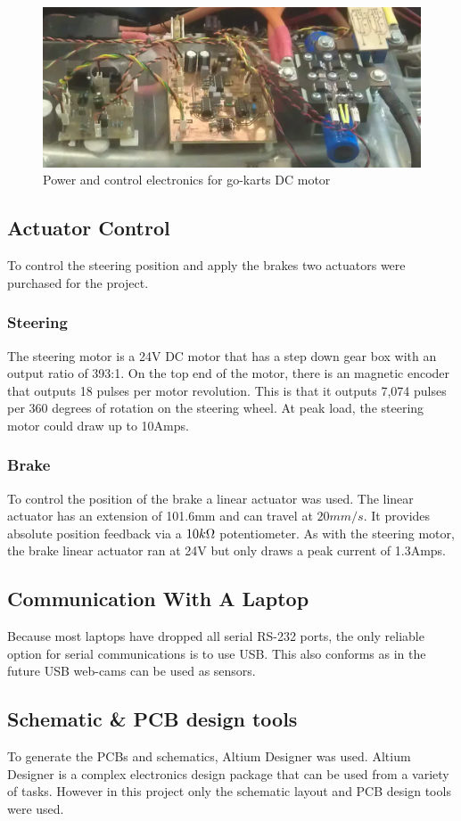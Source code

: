  \begin{figure}[h]
      \centering
      \includegraphics[width=.9\linewidth]{Images/powerE.png}
      \caption{Power and control electronics for go-karts DC motor}
      \label{powerE}
  \end{figure}

\subsection{Actuator Control}
  To control the steering position and apply the brakes two actuators were
  purchased for the project.

  \subsubsection{Steering}
    The steering motor is a 24V DC motor that has a step down gear box with an
    output ratio of 393:1. On the top end of the motor, there is an magnetic
    encoder that outputs 18 pulses per motor revolution. This is that it outputs
    7,074 pulses per 360 degrees of rotation on the steering wheel. At peak
    load, the steering motor could draw up to 10Amps.

  \subsubsection{Brake}
    To control the position of the brake a linear actuator was used. The linear
    actuator has an extension of 101.6mm and can travel at $20mm/s$. It provides
    absolute position feedback via a $10k\ohm$ potentiometer. As with the
    steering motor, the brake linear actuator ran at 24V but only draws a peak
    current of 1.3Amps.

\subsection{Communication With A Laptop}
  Because most laptops have dropped all serial RS-232 ports, the only reliable
  option for serial communications is to use USB. This also conforms as in the
  future USB web-cams can be used as sensors.

\subsection{Schematic \& PCB design tools}
  To generate the PCBs and schematics, Altium Designer was used\cite{altium}.
  Altium Designer is a complex electronics design package that can be used from
  a variety of tasks. However in this project only the schematic layout and PCB
  design tools were used.

